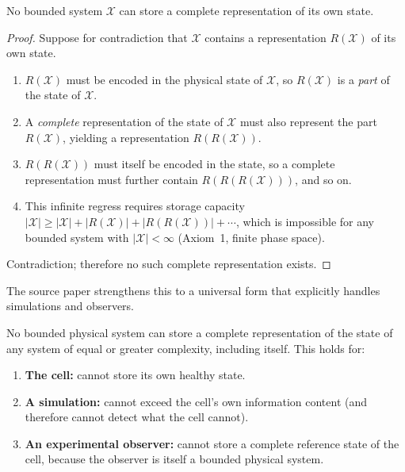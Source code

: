\begin{theorem}
\label{thm:no-template}
No bounded system $\mathcal{X}$ can store a complete representation of its
own state.
\end{theorem}

\begin{proof}
Suppose for contradiction that $\mathcal{X}$ contains a representation
$R(\mathcal{X})$ of its own state.
\begin{enumerate}[label=(\arabic*), itemsep=2pt]
  \item $R(\mathcal{X})$ must be encoded in the physical state of $\mathcal{X}$,
        so $R(\mathcal{X})$ is a \emph{part} of the state of $\mathcal{X}$.
  \item A \emph{complete} representation of the state of $\mathcal{X}$ must
        also represent the part $R(\mathcal{X})$, yielding a representation
        $R(R(\mathcal{X}))$.
  \item $R(R(\mathcal{X}))$ must itself be encoded in the state, so a
        complete representation must further contain $R(R(R(\mathcal{X})))$,
        and so on.
  \item This infinite regress requires storage capacity
        $|\mathcal{X}| \geq |\mathcal{X}| + |R(\mathcal{X})| + |R(R(\mathcal{X}))| + \cdots$,
        which is impossible for any bounded system with
        $|\mathcal{X}| < \infty$ (Axiom~1, finite phase space).
\end{enumerate}
Contradiction; therefore no such complete representation exists.
\end{proof}

The source paper strengthens this to a universal form that explicitly
handles simulations and observers.

\begin{theorem}
\label{thm:universal-no-template}
No bounded physical system can store a complete representation of the state
of any system of equal or greater complexity, including itself.  This holds
for:
\begin{enumerate}[label=(\roman*), itemsep=2pt]
  \item \textbf{The cell:} cannot store its own healthy state.
  \item \textbf{A simulation:} cannot exceed the cell's own information content
        (and therefore cannot detect what the cell cannot).
  \item \textbf{An experimental observer:} cannot store a complete reference
        state of the cell, because the observer is itself a bounded physical
        system.
\end{enumerate}
\end{theorem}

